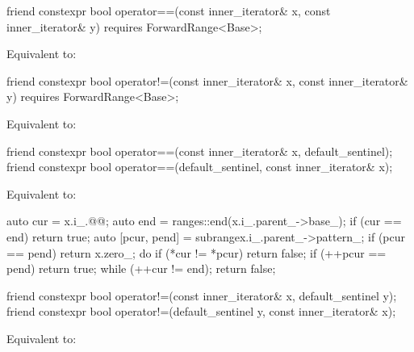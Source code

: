 {%
\begin{itemdecl}
friend constexpr bool operator==(const inner_iterator& x, const inner_iterator& y)
  requires ForwardRange<Base>;
\end{itemdecl}

\begin{itemdescr}
\pnum
\effects Equivalent to: 
\end{itemdescr}

%
\begin{itemdecl}
friend constexpr bool operator!=(const inner_iterator& x, const inner_iterator& y)
  requires ForwardRange<Base>;
\end{itemdecl}

\begin{itemdescr}
\pnum
\effects Equivalent to: 
\end{itemdescr}

{\color{newclr}
%
\begin{itemdecl}
friend constexpr bool operator==(const inner_iterator& x, default_sentinel);
friend constexpr bool operator==(default_sentinel, const inner_iterator& x);
\end{itemdecl}

\begin{itemdescr}
\pnum
\effects Equivalent to:
\begin{codeblock}
auto cur = x.i_.@@;
auto end = ranges::end(x.i_.parent_->base_);
if (cur == end) return true;
auto [pcur, pend] = subrange{x.i_.parent_->pattern_};
if (pcur == pend) return x.zero_;
do {
  if (*cur != *pcur) return false;
  if (++pcur == pend) return true;
} while (++cur != end);
return false;
\end{codeblock}
\end{itemdescr}

%
\begin{itemdecl}
friend constexpr bool operator!=(const inner_iterator& x, default_sentinel y);
friend constexpr bool operator!=(default_sentinel y, const inner_iterator& x);
\end{itemdecl}

\begin{itemdescr}
\pnum
\effects Equivalent to: 
\end{itemdescr}
} %

}
